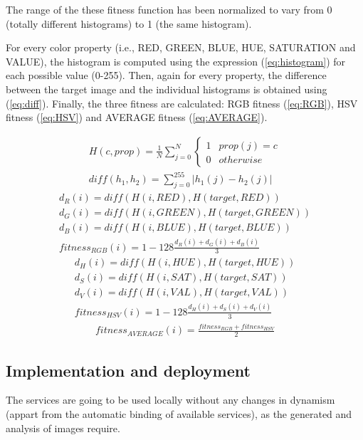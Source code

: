 The range of the these fitness function has been normalized to vary from 0 (totally different histograms) to 1 (the same histogram).

For every color property (i.e., RED, GREEN, BLUE, HUE, SATURATION and VALUE), the histogram is computed using the expression (\ref{eq:histogram}) for each possible value (0-255). Then, again for every property, the difference between the target image and the individual histograms is obtained using (\ref{eq:diff}). Finally, the three fitness are calculated: RGB fitness (\ref{eq:RGB}), HSV fitness (\ref{eq:HSV}) and AVERAGE fitness (\ref{eq:AVERAGE}).

\begin{eqnarray}
  \label{eq:histogram}
  H(c, prop) = \frac{1}{N}\sum_{j=0}^N \left\{\begin{matrix}
1 & prop(j) = c\\ 
0 & otherwise
\end{matrix}\right. \\
\label{eq:diff}
diff(h_1, h_2) = \sum_{j=0}^{255} |h_1(j) - h_2(j)|
\end{eqnarray}
\begin{eqnarray}
  d_R(i) = diff(H(i, RED), H(target, RED))\\
  d_G(i) = diff(H(i, GREEN), H(target, GREEN))\\
  d_B(i) =  diff(H(i, BLUE), H(target, BLUE))\\
  \label{eq:RGB}
  fitness_{RGB}(i) = 1 - 128\frac{d_R(i) + d_G(i) + d_B(i)}{3}
\end{eqnarray}
\begin{eqnarray}
  d_H(i) = diff(H(i, HUE), H(target, HUE))\\
  d_S(i) = diff(H(i, SAT), H(target, SAT))\\
  d_V(i) =  diff(H(i, VAL), H(target, VAL))\\
  \label{eq:HSV}
  fitness_{HSV}(i) = 1 - 128\frac{d_H(i) + d_S(i) + d_V(i)}{3}
\end{eqnarray}
\begin{eqnarray}
  \label{eq:AVERAGE}
  fitness_{AVERAGE}(i) = \frac{fitness_{RGB}+fitness_{HSV}}{2}
\end{eqnarray}




\subsection{Implementation and deployment}


The services are going to be used locally without any changes in dynamism (appart from the automatic binding of available services), as the generated and analysis of images require.


